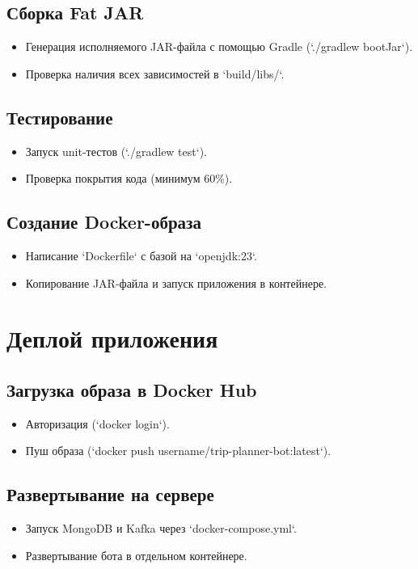 \documentclass[areasetadvanced]{scrartcl}
\begin{document}
\subsection{Сборка Fat JAR}
\begin{itemize}
    \item Генерация исполняемого JAR-файла с помощью Gradle (`./gradlew bootJar`).
    \item Проверка наличия всех зависимостей в `build/libs/`.
\end{itemize}

\subsection{Тестирование}
\begin{itemize}
    \item Запуск unit-тестов (`./gradlew test`).
    \item Проверка покрытия кода (минимум 60\%).
\end{itemize}

\subsection{Создание Docker-образа}
\begin{itemize}
    \item Написание `Dockerfile` с базой на `openjdk:23`.
    \item Копирование JAR-файла и запуск приложения в контейнере.
\end{itemize}

\section{Деплой приложения}

\subsection{Загрузка образа в Docker Hub}
\begin{itemize}
    \item Авторизация (`docker login`).
    \item Пуш образа (`docker push username/trip-planner-bot:latest`).
\end{itemize}

\subsection{Развертывание на сервере}
\begin{itemize}
    \item Запуск MongoDB и Kafka через `docker-compose.yml`.
    \item Развертывание бота в отдельном контейнере.
\end{itemize}
\end{document}
